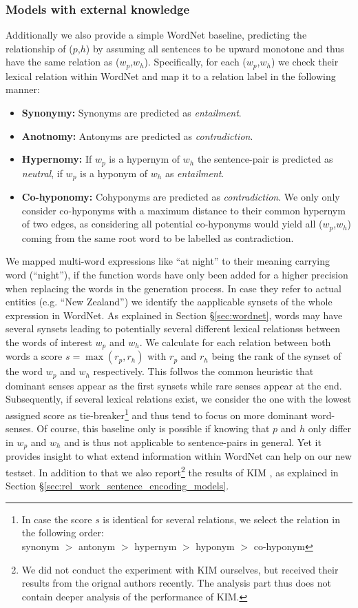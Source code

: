 \subsubsection{Models with external knowledge}
Additionally we also provide a simple WordNet baseline, predicting the relationship of ($p$,$h$) by assuming all sentences to be upward monotone and thus have the same relation as ($w_p$,$w_h$). Specifically, for each ($w_p$,$w_h$) we check their lexical relation within WordNet and map it to a relation label in the following manner:
\begin{itemize}
\item \textbf{Synonymy:} Synonyms are predicted as \textit{entailment}.
\item \textbf{Anotnomy:} Antonyms are predicted as \textit{contradiction}.
\item \textbf{Hypernomy:} If $w_p$ is a hypernym of $w_h$ the sentence-pair is predicted as \textit{neutral}, if $w_p$ is a hyponym of $w_h$ as \textit{entailment}.
\item \textbf{Co-hyponomy:} Cohyponyms are predicted as \textit{contradiction}. We only only consider co-hyponyms with a maximum distance to their common hypernym of two edges, as considering all potential co-hyponyms would yield all ($w_p$,$w_h$) coming from the same root word to be labelled as contradiction.
\end{itemize}
We mapped multi-word expressions like ``at night'' to their meaning carrying word (``night''), if the function words have only been added for a higher precision when replacing the words in the generation process. In case they refer to actual entities (e.g. ``New Zealand'') we identify the aapplicable synsets of the whole expression in WordNet. As explained in Section §\ref{sec:wordnet}, words may have several synsets leading to potentially several different lexical relationss between the words of interest $w_p$ and $w_h$. We calculate for each relation between both words a score $s=\max(r_p,r_h)$ with $r_p$ and $r_h$ being the rank of the synset of the word $w_p$ and $w_h$ respectively. This follwos the common heuristic that dominant senses appear as the first synsets while rare senses appear at the end. Subsequently, if several lexical relations exist, we consider the one with the lowest assigned score as tie-breaker\footnote{In case the score $s$ is identical for several relations, we select the relation in the following order:\\ synonym $>$ antonym $>$ hypernym $>$ hyponym $>$ co-hyponym } and thus tend to focus on more dominant word-senses. Of course, this baseline only is possible if knowing that $p$ and $h$ only differ in $w_p$ and $w_h$ and is thus not applicable to sentence-pairs in general. Yet it provides insight to what extend information within WordNet can help on our new testset. In addition to that we also report\footnote{We did not conduct the experiment with \ac{KIM} ourselves, but received their results from the orignal authors recently. The analysis part thus does not contain deeper analysis of the performance of KIM.} the results of \ac{KIM} \citep{chen2017natural}, as explained in Section §\ref{sec:rel_work_sentence_encoding_models}.
